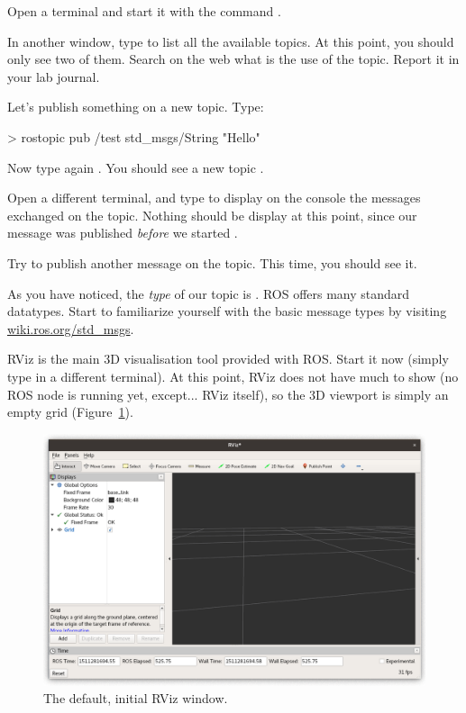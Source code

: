 \documentclass{instructions}
\begin{document}
Open a terminal and start it with the command .

In another window, type  to list all the available topics. At
this point, you should only see two of them. Search on the web what is the use
of the  topic. Report it in your lab journal.

Let's publish something on a new topic. Type: 

\begin{shcode}
> rostopic pub /test std_msgs/String "Hello"
\end{shcode}

Now type again . You should see a new topic .

Open a different terminal, and type  to display on the
console the messages exchanged on the  topic. Nothing should be
display at this point, since our  message was published
\emph{before} we started .

Try to publish another message on the  topic. This time, you should
see it.


As you have noticed, the \emph{type} of our  topic is
. ROS offers many standard datatypes. Start to familiarize
yourself with the basic message types by visiting
\href{http://wiki.ros.org/std_msgs}{wiki.ros.org/std\_msgs}.


RViz is the main 3D visualisation tool provided with ROS. Start it now (simply
type  in a different terminal). At this point, RViz does not have much to
show (no ROS node is running yet, except... RViz itself), so the 3D viewport is
simply an empty grid (Figure~\ref{rviz}).

\begin{figure}[h!]
    \centering
    \includegraphics[width=0.7\linewidth]{rviz}
    \caption{The default, initial RViz window.}
    \label{rviz}
\end{figure}
\end{document}

